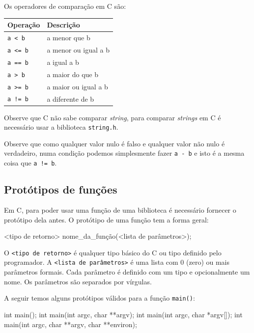 \documentclass[
]{article}
\newenvironment{Shaded}{}{}
\newcommand{\DataTypeTok}[1]{\textcolor[rgb]{0.56,0.13,0.00}{#1}}
\newcommand{\NormalTok}[1]{#1}
\begin{document}
Os operadores de comparação em C são:

\begin{longtable}[]{@{}ll@{}}
\toprule
Operação & Descrição\tabularnewline
\midrule
\endhead
\texttt{a\ \textless{}\ b} & a menor que b\tabularnewline
\texttt{a\ \textless{}=\ b} & a menor ou igual a b\tabularnewline
\texttt{a\ ==\ b} & a igual a b\tabularnewline
\texttt{a\ \textgreater{}\ b} & a maior do que b\tabularnewline
\texttt{a\ \textgreater{}=\ b} & a maior ou igual a b\tabularnewline
\texttt{a\ !=\ b} & a diferente de b\tabularnewline
\bottomrule
\end{longtable}

Observe que C não sabe comparar \emph{string}, para comparar
\emph{strings} em C é necessário usar a biblioteca \texttt{string.h}.

Observe que como qualquer valor nulo é falso e qualquer valor não nulo é
verdadeiro, numa condição podemos simplesmente fazer \texttt{a\ -\ b} e
isto é a mesma coisa que \texttt{a\ !=\ b}.

\hypertarget{protuxf3tipos-de-funuxe7uxf5es}{%
\subsection{Protótipos de
funções}\label{protuxf3tipos-de-funuxe7uxf5es}}

Em C, para poder usar uma função de uma biblioteca é necessário fornecer
o protótipo dela antes. O protótipo de uma função tem a forma geral:

\begin{Shaded}
\begin{Highlighting}[]
\NormalTok{<tipo de retorno> nome_da_função(<lista de parâmetros>);}
\end{Highlighting}
\end{Shaded}

O \texttt{\textless{}tipo\ de\ retorno\textgreater{}} é qualquer tipo
básico do C ou tipo definido pelo programador. A
\texttt{\textless{}lista\ de\ parâmetros\textgreater{}} é uma lista com
0 (zero) ou mais parâmetros formais. Cada parâmetro é definido com um
tipo e opcionalmente um nome. Os parâmetros são separados por vírgulas.

A seguir temos alguns protótipos válidos para a função \texttt{main()}:

\begin{Shaded}
\begin{Highlighting}[]
\DataTypeTok{int}\NormalTok{ main();}
\DataTypeTok{int}\NormalTok{ main(}\DataTypeTok{int}\NormalTok{ argc, }\DataTypeTok{char}\NormalTok{ **argv);}
\DataTypeTok{int}\NormalTok{ main(}\DataTypeTok{int}\NormalTok{ argc, }\DataTypeTok{char}\NormalTok{ *argv[]);}
\DataTypeTok{int}\NormalTok{ main(}\DataTypeTok{int}\NormalTok{ argc, }\DataTypeTok{char}\NormalTok{ **argv, }\DataTypeTok{char}\NormalTok{ **environ);}
\end{Highlighting}
\end{Shaded}
\end{document}
